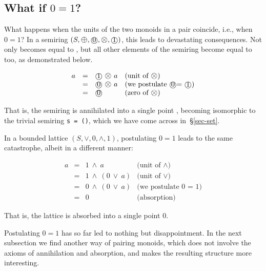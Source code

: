\documentclass[english,submission]{programming}
\newcommand{\hcode}[1]{{\color{darkblue} \lstinline[keywordstyle={}]|#1|}} %
\newcommand{\add}{\text{\raisebox{-0.1mm}{\large $\oplus$}}}
\newcommand{\mul}{\text{\raisebox{-0.1mm}{\large $\otimes$}}}
\newcommand{\zero}{\raisebox{-0.2mm}{\textcircled{0}}\xspace}
\newcommand{\one}{\raisebox{-0.2mm}{\textcircled{1}}\xspace}
\begin{document}
\subsection{What if $0=1$?}

What happens when the units of the two monoids in a pair coincide, i.e., when
$0=1$?
In a semiring $(S, \add, \zero, \mul, \one)$, this leads to devastating
consequences. Not only \one becomes equal to \zero, but all other elements of
the semiring become equal to \zero too, as demonstrated below.

\vspace{-5mm}
\begin{equation*}
\begin{array}{rcll}
a & = & \one\ \mul\ a & \text{(unit of $\mul$)}\\
 & = & \zero\ \mul\ a & \text{(we postulate \zero = \one)}\\
 & = & \zero & \text{(zero of $\mul$)}
\end{array}
\end{equation*}
\vspace{-3mm}

\noindent
That is, the semiring is annihilated into a single point \zero, becoming
isomorphic to the trivial semiring \hcode{s = ()}, which we have come across
in~\S\ref{sec-set}.

In a bounded lattice $(S, \vee, 0, \wedge, 1)$, postulating $0 = 1$ leads to the
same catastrophe, albeit in a different manner:

\vspace{-5mm}
\begin{equation*}
\begin{array}{rcll}
a & = & 1\ \wedge\ a & \text{(unit of $\wedge$)}\\
 & = & 1\ \wedge\ (0\  \vee\  a) & \text{(unit of $\vee$)}\\
 & = & 0\ \wedge\ (0\  \vee\  a) & \text{(we postulate 0 = 1)}\\
 & = & 0 & \text{(absorption)}
\end{array}
\end{equation*}
\vspace{-3mm}

\noindent
That is, the lattice is absorbed into a single point $0$.

Postulating $0 = 1$ has so far led to nothing but disappointment. In the
next subsection we find another way of pairing monoids, which does not involve
the axioms of annihilation and absorption, and makes the resulting structure
more interesting.
\end{document}

